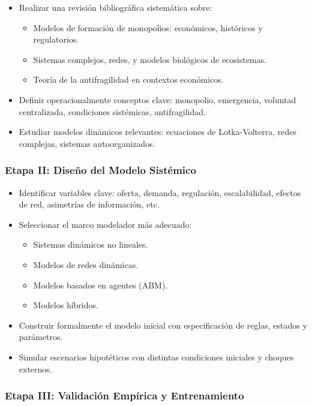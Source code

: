 \documentclass[a4paper,12pt]{article}
\begin{document}
\begin{enumerate}
\begin{itemize}
    \item Realizar una revisión bibliográfica sistemática sobre:
    \begin{itemize}
        \item Modelos de formación de monopolios: económicos, históricos y regulatorios.
        \item Sistemas complejos, redes, y modelos biológicos de ecosistemas.
        \item Teoría de la antifragilidad en contextos económicos.
    \end{itemize}
    \item Definir operacionalmente conceptos clave: monopolio, emergencia, voluntad centralizada, condiciones sistémicas, antifragilidad.
    \item Estudiar modelos dinámicos relevantes: ecuaciones de Lotka-Volterra, redes complejas, sistemas autoorganizados.
\end{itemize}

\subsubsection*{Etapa II: Diseño del Modelo Sistémico}

\begin{itemize}
    \item Identificar variables clave: oferta, demanda, regulación, escalabilidad, efectos de red, asimetrías de información, etc.
    \item Seleccionar el marco modelador más adecuado:
    \begin{itemize}
        \item Sistemas dinámicos no lineales.
        \item Modelos de redes dinámicas.
        \item Modelos basados en agentes (ABM).
        \item Modelos híbridos.
    \end{itemize}
    \item Construir formalmente el modelo inicial con especificación de reglas, estados y parámetros.
    \item Simular escenarios hipotéticos con distintas condiciones iniciales y choques externos.
\end{itemize}

\subsubsection*{Etapa III: Validación Empírica y Entrenamiento}


\end{enumerate}
\end{document}
